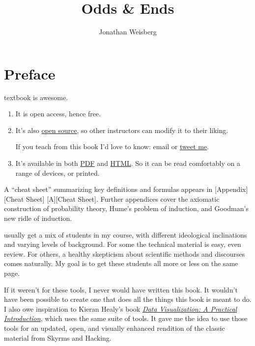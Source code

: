 \documentclass[justified]{tufte-book}
\title{Odds \& Ends}
\author{Jonathan Weisberg}
\date{}
\providecommand{\tightlist}{%
  \setlength{\itemsep}{0pt}\setlength{\parskip}{0pt}}
\begin{document}
\maketitle



{
\setcounter{tocdepth}{0}
\tableofcontents
}

\hypertarget{preface}{%
\chapter*{Preface}\label{preface}}

 textbook is awesome.

\begin{enumerate}
\def\labelenumi{\arabic{enumi}.}
\tightlist
\item
  It is open access, hence free.
\item
  It's also \href{https://github.com/jweisber/vip-source}{open source}, so other instructors can modify it to their liking.

  \begin{marginfigure}
   If you teach from this book I'd love to know: email or
   \href{https://twitter.com/jweisber}{tweet me}.
   \end{marginfigure}
\item
  It's available in both \href{http://jonathanweisberg.org/vip/_main.pdf}{PDF} and \href{http://jonathanweisberg.org/vip/}{HTML}. So it can be read comfortably on a range of devices, or printed.
\end{enumerate}

A ``cheat sheet'' summarizing key definitions and formulas appears in {[}Appendix{]}{[}Cheat Sheet{]} {[}A{]}{[}Cheat Sheet{]}. Further appendices cover the axiomatic construction of probability theory, Hume's problem of induction, and Goodman's new ridle of induction.

 usually get a mix of students in my course, with different ideological inclinations and varying levels of background. For some the technical material is easy, even review. For others, a healthy skepticism about scientific methods and discourses comes naturally. My goal is to get these students all more or less on the same page.

If it weren't for these tools, I never would have written this book. It wouldn't have been possible to create one that does all the things this book is meant to do. I also owe inspiration to Kieran Healy's book \href{http://socviz.co/}{\emph{Data Visualization: A Practical Introduction}}, which uses the same suite of tools. It gave me the idea to use those tools for an updated, open, and visually enhanced rendition of the classic material from Skyrms and Hacking.
\end{document}
